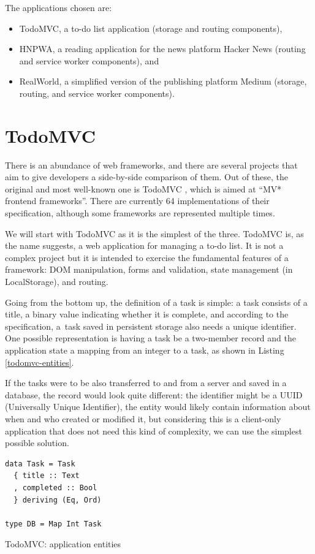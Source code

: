 \documentclass[english,zadani,odsaz]{fitthesis}
\begin{document}
The applications chosen are:
\begin{itemize}
\item TodoMVC, a to-do list application (storage and routing components),
\item HNPWA, a reading application for the news platform Hacker News (routing and
service worker components), and
\item RealWorld, a simplified version of the publishing platform Medium (storage,
routing, and service worker components).
\end{itemize}

\section{TodoMVC}
\label{sec:org47fa21d}
There is an abundance of web frameworks, and there are several projects that aim
to give developers a side-by-side comparison of them. Out of these, the original
and most well-known one is TodoMVC \cite{todomvc}, which is aimed at ``MV* frontend
frameworks''. There are currently 64 implementations of their specification, although
some frameworks are represented multiple times.

We will start with TodoMVC as it is the simplest of the three. TodoMVC is, as
the name suggests, a web application for managing a to-do list. It is not a
complex project but it is intended to exercise the fundamental features of a
framework: DOM manipulation, forms and validation, state management (in
LocalStorage), and routing.

Going from the bottom up, the definition of a task is simple: a task consists of
a title, a binary value indicating whether it is complete, and according to the
specification, a~task saved in persistent storage also needs a unique
identifier. One possible representation is having a task be a two-member record
and the application state a mapping from an integer to a task, as shown in
Listing \ref{todomvc-entities}.

If the tasks were to be also transferred to and from a server and saved in a
database, the record would look quite different: the identifier might be a UUID
(Universally Unique Identifier), the entity would likely contain information
about when and who created or modified it, but considering this is a client-only
application that does not need this kind of complexity, we can use the simplest
possible solution.

\begin{listing}[tb]
\begin{verbatim}
data Task = Task
  { title :: Text
  , completed :: Bool
  } deriving (Eq, Ord)

type DB = Map Int Task
\end{verbatim}
\caption{TodoMVC: application entities \label{todomvc-entities}}
\end{listing}
\end{document}
